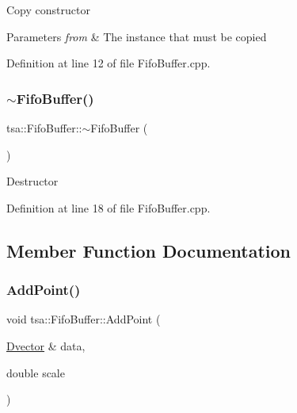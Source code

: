 Copy constructor


\begin{DoxyParams}{Parameters}
{\em from} & The instance that must be copied \\
\hline
\end{DoxyParams}


Definition at line 12 of file Fifo\+Buffer.\+cpp.

\mbox{\label{classtsa_1_1_fifo_buffer_ad7bec7c4fc528a12763f29c8f6a8e460}} 
\subsubsection{\texorpdfstring{$\sim$\+Fifo\+Buffer()}{~FifoBuffer()}}
{\footnotesize\ttfamily tsa\+::\+Fifo\+Buffer\+::$\sim$\+Fifo\+Buffer (\begin{DoxyParamCaption}{ }\end{DoxyParamCaption})}

Destructor 

Definition at line 18 of file Fifo\+Buffer.\+cpp.



\subsection{Member Function Documentation}
\mbox{\label{classtsa_1_1_fifo_buffer_a7058127e3d126d9d6f434d3bf386c59b}} 
\subsubsection{\texorpdfstring{Add\+Point()}{AddPoint()}\hspace{0.1cm}{\footnotesize\ttfamily [1/2]}}
{\footnotesize\ttfamily void tsa\+::\+Fifo\+Buffer\+::\+Add\+Point (\begin{DoxyParamCaption}\item[{\hyperlink{namespacetsa_a8900fb03d849baf447a1a0efe2561fb2}{Dvector} \&}]{data,  }\item[{double}]{scale }\end{DoxyParamCaption})}

